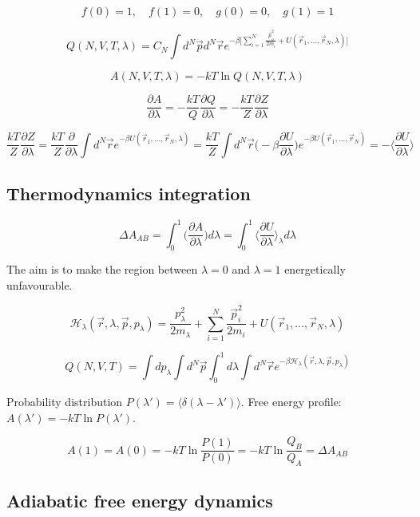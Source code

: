 	$$f(0) = 1, \quad f(1) = 0,\quad g(0) = 0, \quad g(1) = 1$$

	$$Q(N, V, T, \lambda) = C_N\int d^N\vec{p}d^N\vec{r}e^{-\beta\biggl[\sum\limits_{i=1}^N\frac{\vec{p}_o^2}{2m_i}+U(\vec{r}_1, \dots, \vec{r}_N, \lambda)\biggr]}$$

	$$A(N, V, T, \lambda) = -kT\ln Q(N, V, T, \lambda)$$

	$$\frac{\partial A}{\partial \lambda} = -\frac{kT}{Q}\frac{\partial Q}{\partial \lambda} = -\frac{kT}{Z}\frac{\partial Z}{\partial\lambda}$$

	$$\frac{kT}{Z}\frac{\partial Z}{\partial \lambda} = \frac{kT}{Z}\frac{\partial}{\partial\lambda}\int d^N\vec{r}e^{-\beta U(\vec{r}_1, \dots, \vec{r}_N, \lambda)} = \frac{kT}{Z}\int d^{N}\vec{r}\biggl(-\beta\frac{\partial U}{\partial\lambda}\biggr)e^{-\beta U(\vec{r}_1, \dots, \vec{r}_N)} = -\biggl\langle\frac{\partial U}{\partial\lambda}\biggr\rangle$$

	\subsection{Thermodynamics integration}

	$$\Delta A_{AB} = \int_0^1\biggl(\frac{\partial A}{\partial \lambda}\biggr)d\lambda = \int_0^1\biggl\langle\frac{\partial U}{\partial\lambda}\biggr\rangle_\lambda d\lambda$$

	The aim is to make the region between $\lambda=0$ and $\lambda=1$ energetically unfavourable.

	$$\mathcal{H}_\lambda(\vec{r}, \lambda, \vec{p}, p_\lambda) = \frac{p_\lambda^2}{2m_\lambda} + \sum\limits_{i=1}^N\frac{\vec{p}_i^2}{2m_i} + U(\vec{r}_1, \dots, \vec{r}_N, \lambda)$$

	$$Q(N, V, T) = \int dp_\lambda\int d^N\vec{p}\int_0^1d\lambda\int d^N\vec{r}e^{-\beta\mathcal{H}_\lambda(\vec{r},\lambda,\vec{p}, p_\lambda)}$$

	Probability distribution $P(\lambda') = \langle\delta(\lambda-\lambda')\rangle$.
	Free energy profile: $A(\lambda') = -kT\ln P(\lambda')$.

	$$A(1) = A(0) = -kT\ln\frac{P(1)}{P(0)} = -kT\ln\frac{Q_B}{Q_A} = \Delta A_{AB}$$


	\subsection{Adiabatic free energy dynamics}

